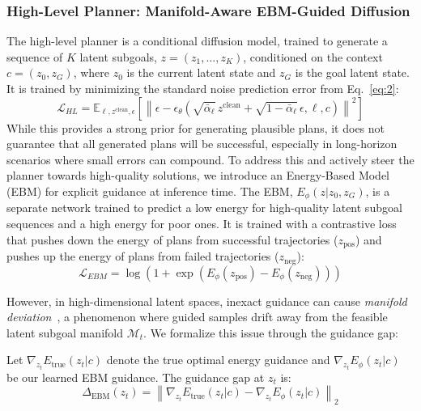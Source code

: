 \documentclass{article} %
\begin{document}
\subsubsection{High-Level Planner: Manifold-Aware EBM-Guided Diffusion}
\vspace{-5pt}
The high-level planner is a conditional diffusion model, trained to generate a sequence of $K$ latent subgoals, $z = (z_1, \dots, z_K)$, conditioned on the context $c=(z_0, z_G)$, where $z_0$ is the current latent state and $z_G$ is the goal latent state. It is trained by minimizing the standard noise prediction error from Eq.~\ref{eq:2}:
\begin{equation}
    \mathcal{L}_{HL} = \mathbb{E}_{\ell, z^{\text{clean}}, \epsilon} \left[ \left\| \epsilon - \epsilon_\theta\!\left(\sqrt{\bar{\alpha}_\ell}\, z^{\text{clean}} + \sqrt{1-\bar{\alpha}_\ell}\, \epsilon, 
    \ell, c\right) \right\|^2 \right]
\end{equation}
While this provides a strong prior for generating plausible plans, it does not guarantee that all generated plans will be successful, especially in long-horizon scenarios where small errors can compound. To address this and actively steer the planner towards high-quality solutions, we introduce an Energy-Based Model (EBM) for explicit guidance at inference time. The EBM, $E_\phi(z | z_0, z_G)$, is a separate network trained to predict a low energy for high-quality latent subgoal sequences and a high energy for poor ones. It is trained with a contrastive loss that pushes down the energy of plans from successful trajectories ($z_{\text{pos}}$) and pushes up the energy of plans from failed trajectories ($z_{\text{neg}}$):
\begin{equation}
    \mathcal{L}_{EBM} = \log(1 + \exp(E_\phi(z_{\text{pos}}) - E_\phi(z_{\text{neg}})))
\end{equation}

However, in high-dimensional latent spaces, inexact guidance can cause \textit{manifold deviation}~\citep{he2024manifold}, a phenomenon where guided samples drift away from the feasible latent subgoal manifold $\mathcal{M}_t$. We formalize this issue through the guidance gap:

\begin{definition}
\label{def:ebm_guidance_gap}
Let $\nabla_{z_t} E_{\text{true}}(z_t|c)$ denote the true optimal energy guidance and $\nabla_{z_t} E_\phi(z_t|c)$ be our learned EBM guidance. The guidance gap at $z_t$ is:
\begin{equation}
    \Delta_{\text{EBM}}(z_t) = \left\|\nabla_{z_t} E_{\text{true}}(z_t|c) - \nabla_{z_t} E_\phi(z_t|c)\right\|_2
\end{equation}
\end{definition}
\end{document}
